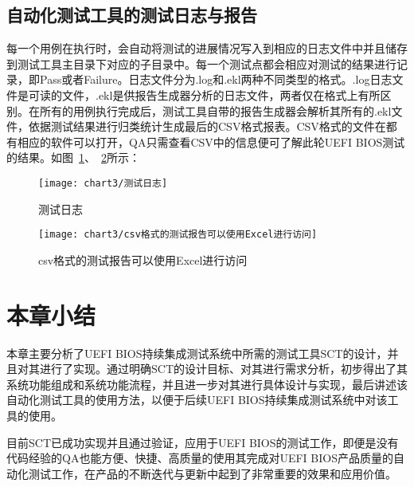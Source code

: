 	\subsection{自动化测试工具的测试日志与报告}
	
		每一个用例在执行时，会自动将测试的进展情况写入到相应的日志文件中并且储存到测试工具主目录下对应的子目录中。每一个测试点都会相应对测试的结果进行记录，即Pass或者Failure。日志文件分为.log和.ekl两种不同类型的格式。.log日志文件是可读的文件，.ekl是供报告生成器分析的日志文件，两者仅在格式上有所区别。在所有的用例执行完成后，测试工具自带的报告生成器会解析其所有的.ekl文件，依据测试结果进行归类统计生成最后的CSV格式报表。CSV格式的文件在都有相应的软件可以打开，QA只需查看CSV中的信息便可了解此轮UEFI BIOS测试的结果。如图~\ref{fig:测试日志}、~\ref{fig:csv格式的测试报告可以使用Excel进行访问}所示：
		
		\begin{figure}[H] %
			\centering
			\texttt{[image: chart3/测试日志]}
			\caption{测试日志}
			\label{fig:测试日志}
		\end{figure}
		
		\begin{figure}[H] %
			\centering
			\texttt{[image: chart3/csv格式的测试报告可以使用Excel进行访问]}
			\caption{csv格式的测试报告可以使用Excel进行访问}
			\label{fig:csv格式的测试报告可以使用Excel进行访问}
		\end{figure}
	
\section{本章小结}
   	
	本章主要分析了UEFI BIOS持续集成测试系统中所需的测试工具SCT的设计，并且对其进行了实现。通过明确SCT的设计目标、对其进行需求分析，初步得出了其系统功能组成和系统功能流程，并且进一步对其进行具体设计与实现，最后讲述该自动化测试工具的使用方法，以便于后续UEFI BIOS持续集成测试系统中对该工具的使用。
	
	目前SCT已成功实现并且通过验证，应用于UEFI BIOS的测试工作，即便是没有代码经验的QA也能方便、快捷、高质量的使用其完成对UEFI BIOS产品质量的自动化测试工作，在产品的不断迭代与更新中起到了非常重要的效果和应用价值。

	